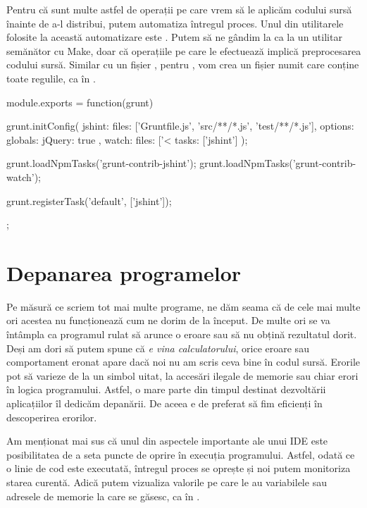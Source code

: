 Pentru că sunt multe astfel de operații pe care vrem să le aplicăm codului sursă
înainte de a-l distribui, putem automatiza întregul proces. Unul din utilitarele
folosite la această automatizare este . Putem să ne gândim la 
ca la un utilitar semănător cu Make, doar că operațiile pe care  le
efectuează implică preprocesarea codului sursă. Similar cu un fișier , pentru
, vom crea un fișier numit  care conține toate regulile, ca în .

\begin{screen}[caption={Exemplu cod Gruntfile},label={lst:appdev:gruntfile}]
module.exports = function(grunt) {

 grunt.initConfig({
   jshint: {
     files: ['Gruntfile.js', 'src/**/*.js', 'test/**/*.js'],
     options: {
       globals: {
         jQuery: true
       }
     }
   },
   watch: {
     files: ['<%
     tasks: ['jshint']
   }
 });

 grunt.loadNpmTasks('grunt-contrib-jshint');
 grunt.loadNpmTasks('grunt-contrib-watch');

 grunt.registerTask('default', ['jshint']);

};
\end{screen}

\section{Depanarea programelor}
\label{sec:appdev:debug}

Pe măsură ce scriem tot mai multe programe, ne dăm seama că de cele mai multe
ori acestea nu funcționează cum ne dorim de la început. De multe ori se va
întâmpla ca programul rulat să arunce o eroare sau să nu obțină rezultatul
dorit. Deși am dori să putem spune că \textit{e vina calculatorului}, orice
eroare sau comportament eronat apare dacă noi nu am scris ceva bine în codul
sursă. Erorile pot să varieze de la un simbol uitat,
la accesări ilegale de memorie sau chiar erori în logica programului. Astfel, o
mare parte din timpul destinat dezvoltării aplicațiilor îl dedicăm depanării. De
aceea e de preferat să fim eficienți în descoperirea erorilor.

Am menționat mai sus că unul din aspectele importante ale unui IDE este
posibilitatea de a seta puncte de oprire în execuția programului. Astfel, odată
ce o linie de cod este executată, întregul proces se oprește și noi putem
monitoriza starea curentă. Adică putem vizualiza valorile pe care le au
variabilele sau adresele de memorie la care se găsesc, ca în .

